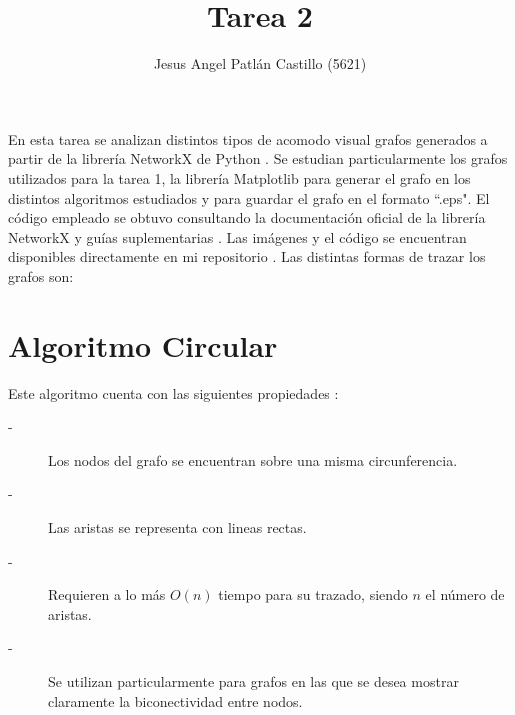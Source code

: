 \documentclass{article}
\title{Tarea 2}
\author{Jesus Angel Patlán Castillo (5621)}
\date{\displaydate{date}}
\begin{document}
 
 
\lstset{style=mystyle}


\maketitle

En esta tarea se analizan distintos tipos de acomodo visual grafos generados a partir de la librería NetworkX \cite{NetworkX} de Python \cite{Python}. Se estudian particularmente los grafos utilizados para la tarea 1, la librería Matplotlib \cite{Matplotlib} para generar el grafo en los distintos algoritmos estudiados y para guardar el grafo en el formato ``.eps". El código empleado se obtuvo consultando la documentación oficial de la librería NetworkX \cite{NetworkXD} y guías suplementarias \cite{SOQ1,SOQ2}. Las imágenes y el código se encuentran disponibles directamente en mi repositorio \cite{JAPC}. Las distintas formas de trazar los grafos son:



\section{Algoritmo Circular}
Este algoritmo cuenta con las siguientes propiedades \cite{six1999framework}:
\begin{description}
\item[-]Los nodos del grafo se  encuentran sobre una misma circunferencia.
\item[-]Las aristas se representa con lineas rectas.
\item[-]Requieren a lo más $O(n)$ tiempo para su trazado, siendo $n$ el número de aristas.
\item[-]Se utilizan particularmente para grafos en las que se desea mostrar claramente la biconectividad entre nodos.
\end{description}
\end{document}
